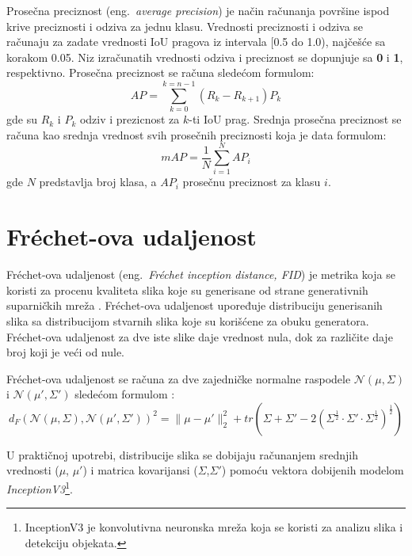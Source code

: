 \documentclass[12pt,oneside]{memoir}
\begin{document}
Prosečna preciznost (eng.~\textit{average precision}) je način računanja površine ispod krive preciznosti i odziva za jednu klasu. Vrednosti preciznosti i odziva se računaju za zadate vrednosti IoU pragova iz intervala [0.5 do 1.0), najčešće sa korakom 0.05.
Niz izračunatih vrednosti odziva i preciznost se dopunjuje sa \textbf{0} i \textbf{1}, respektivno. 
Prosečna preciznost se računa sledećom formulom:
\begin{equation}
\label{eq:ap}
    AP = \sum_{k=0}^{k=n-1} (R_{k} - R_{k+1})P_{k}
\end{equation}
gde su \(R_{k}\) i \(P_{k}\) odziv i prezicnost za \(k\)-ti IoU prag.
Srednja prosečna preciznost se računa kao srednja vrednost svih prosečnih preciznosti koja je data formulom:
\begin{equation}
\label{eq:map}
    mAP =\frac{1}{N} \sum_{i=1}^{N} AP_{i}
\end{equation}
gde \(N\) predstavlja broj klasa, a \(AP_{i}\) prosečnu preciznost za klasu 
\(i\).

\section{Fréchet-ova udaljenost}

Fréchet-ova udaljenost (eng.~\textit{Fréchet inception distance, FID}) je metrika koja se koristi za procenu kvaliteta slika koje su generisane od strane generativnih suparničkih mreža \cite{heusel2017gans}. Fréchet-ova udaljenost upoređuje distribuciju generisanih slika sa distribucijom stvarnih slika koje su korišćene za obuku generatora. Fréchet-ova udaljenost za dve iste slike daje vrednost nula, dok za različite daje broj koji je veći od nule.  

Fréchet-ova udaljenost se računa za dve zajedničke normalne raspodele \(\mathcal{N}(\mu,\Sigma)\) i \(\mathcal{N}(\mu',\Sigma')\) sledećom formulom \cite{dowson1982frechet}:
\begin{equation}
    d_{F}(\mathcal N(\mu, \Sigma), \mathcal N(\mu', \Sigma'))^2 =
        \| \mu - \mu' \|^{2}_{2} + 
        tr\left(\Sigma + \Sigma' -
        2\left(\Sigma^\frac{1}{2} \cdot \Sigma' \cdot \Sigma^\frac{1}{2} \right)^\frac{1}{2} \right)
\end{equation}

U praktičnoj upotrebi, distribucije slika se dobijaju računanjem srednjih vrednosti (\(\mu\), \(\mu'\)) i matrica kovarijansi (\(\Sigma\),\(\Sigma'\)) pomoću vektora dobijenih modelom \textit{InceptionV3}\footnote{InceptionV3 je konvolutivna neuronska mreža koja se koristi za analizu slika i detekciju objekata.}. %
\end{document}
